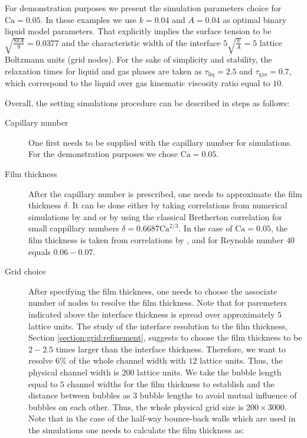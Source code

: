 \documentclass[preprint,12pt]{elsarticle}
\newcommand{\Ca}{\mathrm{Ca}}
\begin{document}
{\color{red}
For demonstration purposes we present the simulation parameters choice for $\Ca=0.05$.
In these
examples we use $k=0.04$ and $A=0.04$ as optimal binary liquid model parameters.
That explicitly implies the surface tension to be $\sqrt{\frac{8 k
A}{9}}=0.0377$ and the characteristic width of the interface
$5\sqrt{\frac{k}{A}}=5$ lattice Boltzmann units (grid nodes). For the sake of simplicity and
stability, the relaxation times for liquid and gas phases are taken as
$\tau_{\mathrm{liq}}=2.5$ and $\tau_{\mathrm{gas}}=0.7$, which correspond
to the liquid over gas kinematic viscosity ratio equal to $10$.

Overall, the setting simulations procedure can be described in steps as follows:
\begin{description}
 \item[Capillary number] One first needs to be supplied with the capillary number for
simulations. For the demonstration purposes we chose $\Ca=0.05$. 
 \item[Film thickness] After the capillary number is prescribed, one needs to approximate the film
thickness $\delta$. It can be done either by taking correlations from numerical simulations by
\citet{heil-bretherton} and \citet{giavedoni-numerical} or by using the classical Bretherton
correlation for small cappillary numbers $\delta=0.6687 \Ca^{2/3}$. In the case of $\Ca=0.05$, the 
film thickness is taken from correlations by \citet{heil-bretherton} 
, and for Reynolds number $40$ equals $0.06-0.07$.  
\item[Grid choice] After specifying the film thickness, one needs to choose the associate
number of nodes to resolve the film thickness. Note that for paremeters indicated above the
interface thickness is spread over approximately $5$ lattice units. The study of the interface
resolution to the film thickness, Section \ref{section:grid:refinement}, suggests to choose the
film thickness to be $2-2.5$ times larger than the interface thickness. Therefore, we want to
  resolve $6\%$ of the whole channel width with $12$ lattice units.  Thus, the physical channel
  width is $200$ lattice units. We take the bubble length equal to $5$ channel widths for the film
thickness to establish
  and the distance between bubbles as $3$ bubble lengths to avoid mutual influence of bubbles on
each other. Thus, the whole physical grid size is $200 \times 3000$. Note that in the case of the
half-way bounce-back walls \cite{yu} which are used in the
simulations one needs to calculate the film thickness as:

\end{description}}
\end{document}
